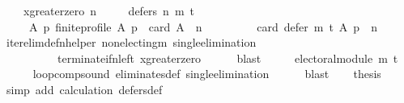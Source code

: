 \begin{isabellebody}
\ \ \ \ x{\isacharunderscore}{\kern0pt}greater{\isacharunderscore}{\kern0pt}zero{\isacharcolon}{\kern0pt}\ {\isachardoublequoteopen}n\ {\isachargreater}{\kern0pt}\ {}{\isachardoublequoteclose}\isanewline
\ \ \ {\isachardoublequoteopen}defers\ n\ {\isacharparenleft}{\kern0pt}m\ {\isasymcirclearrowleft}\isactrlsub t{\isacharparenright}{\kern0pt}{\isachardoublequoteclose}\isanewline
%
\isadelimproof
%
\endisadelimproof
%
\isatagproof
{}\isamarkupfalse%
\ {\isacharminus}{\kern0pt}\isanewline
\ \ \isamarkupfalse%
\isanewline
\ \ \ \ {\isachardoublequoteopen}{\isasymforall}\ A\ p{\isachardot}{\kern0pt}\ finite{\isacharunderscore}{\kern0pt}profile\ A\ p\ {\isasymand}\ card\ A\ {\isasymge}\ n\ {\isasymlongrightarrow}\isanewline
\ \ \ \ \ \ \ \ card\ {\isacharparenleft}{\kern0pt}defer\ {\isacharparenleft}{\kern0pt}m\ {\isasymcirclearrowleft}\isactrlsub t{\isacharparenright}{\kern0pt}\ A\ p{\isacharparenright}{\kern0pt}\ {\isacharequal}{\kern0pt}\ n{\isachardoublequoteclose}\isanewline
\ \ \ \ \isamarkupfalse%
\ iter{\isacharunderscore}{\kern0pt}elim{\isacharunderscore}{\kern0pt}def{\isacharunderscore}{\kern0pt}n{\isacharunderscore}{\kern0pt}helper\ non{\isacharunderscore}{\kern0pt}electing{\isacharunderscore}{\kern0pt}m\ single{\isacharunderscore}{\kern0pt}elimination\isanewline
\ \ \ \ \ \ \ \ \ \ terminate{\isacharunderscore}{\kern0pt}if{\isacharunderscore}{\kern0pt}n{\isacharunderscore}{\kern0pt}left\ x{\isacharunderscore}{\kern0pt}greater{\isacharunderscore}{\kern0pt}zero\isanewline
\ \ \ \ \isamarkupfalse%
\ blast\isanewline
\ \ \isamarkupfalse%
\ \isamarkupfalse%
\ {\isachardoublequoteopen}electoral{\isacharunderscore}{\kern0pt}module\ {\isacharparenleft}{\kern0pt}m\ {\isasymcirclearrowleft}\isactrlsub t{\isacharparenright}{\kern0pt}{\isachardoublequoteclose}\isanewline
\ \ \ \ \isamarkupfalse%
\ loop{\isacharunderscore}{\kern0pt}comp{\isacharunderscore}{\kern0pt}sound\ eliminates{\isacharunderscore}{\kern0pt}def\ single{\isacharunderscore}{\kern0pt}elimination\isanewline
\ \ \ \ \isamarkupfalse%
\ blast\isanewline
\ \ \isamarkupfalse%
\ {\isacharquery}{\kern0pt}thesis\isanewline
\ \ \ \ \isamarkupfalse%
\ {\isacharparenleft}{\kern0pt}simp\ add{\isacharcolon}{\kern0pt}\ calculation\ defers{\isacharunderscore}{\kern0pt}def{\isacharparenright}{\kern0pt}\isanewline
{}\isamarkupfalse%
%
\endisatagproof
{\isafoldproof}%
%
\isadelimproof
\isanewline
%
\endisadelimproof
%
\isadelimtheory
\isanewline
%
\endisadelimtheory
%
\isatagtheory
{}\isamarkupfalse%
%
\endisatagtheory
{\isafoldtheory}%
%
\isadelimtheory
%
\endisadelimtheory
%
\end{isabellebody}%

